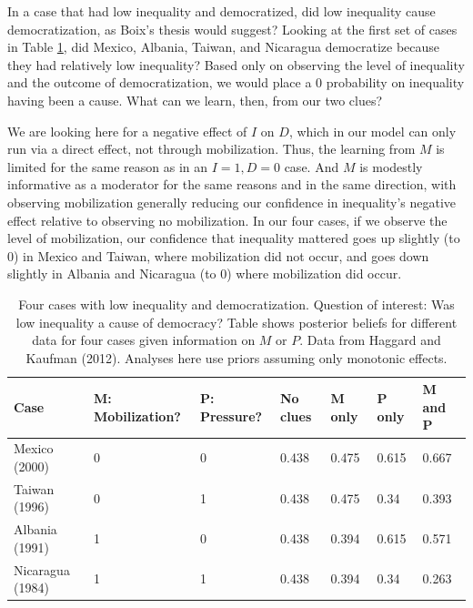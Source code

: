 \documentclass[
  12pt,
]{book}
\begin{document}
In a case that had low inequality and democratized, did low inequality cause democratization, as Boix's thesis would suggest? Looking at the first set of cases in Table \ref{tab:HK8cases1}, did Mexico, Albania, Taiwan, and Nicaragua democratize because they had relatively low inequality? Based only on observing the level of inequality and the outcome of democratization, we would place a 0 probability on inequality having been a cause. What can we learn, then, from our two clues?

We are looking here for a negative effect of \(I\) on \(D\), which in our model can only run via a direct effect, not through mobilization. Thus, the learning from \(M\) is limited for the same reason as in an \(I=1, D=0\) case. And \(M\) is modestly informative as a moderator for the same reasons and in the same direction, with observing mobilization generally reducing our confidence in inequality's negative effect relative to observing no mobilization. In our four cases, if we observe the level of mobilization, our confidence that inequality mattered goes up slightly (to 0) in Mexico and Taiwan, where mobilization did not occur, and goes down slightly in Albania and Nicaragua (to 0) where mobilization did occur.

\begin{table}

\caption{\label{tab:HK8cases1}Four cases with low inequality and  democratization. Question of interest: Was low inequality a cause of democracy? Table shows posterior beliefs for different data for four cases given information on $M$ or $P$. Data from Haggard and Kaufman (2012). Analyses here use priors assuming only monotonic effects.}
\centering
\begin{tabular}[t]{l|l|l|l|l|l|l}
\hline
Case & M: Mobilization? & P: Pressure? & No clues & M only & P only & M and P\\
\hline
Mexico (2000) & 0 & 0 & 0.438 & 0.475 & 0.615 & 0.667\\
\hline
Taiwan (1996) & 0 & 1 & 0.438 & 0.475 & 0.34 & 0.393\\
\hline
Albania (1991) & 1 & 0 & 0.438 & 0.394 & 0.615 & 0.571\\
\hline
Nicaragua (1984) & 1 & 1 & 0.438 & 0.394 & 0.34 & 0.263\\
\hline
\end{tabular}
\end{table}
\end{document}
